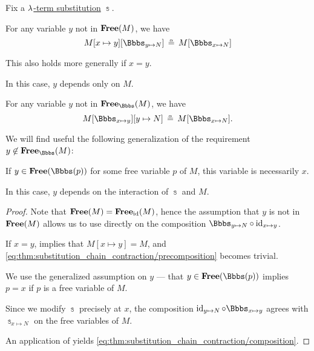 \begin{corollary}\label{thm:substitution_chain_contraction}
  Fix a \hyperref[def:lambda_term_substitution]{\( {\mathrm \lambda} \)-term substitution} \( \Bbbs \).

  \begin{thmenum}
     For any variable \( y \) not in \( \op*{Free}(M) \), we have
    \begin{equation}\label{eq:thm:substitution_chain_contraction/precomposition}
      M[x \mapsto y][\Bbbs_{y \mapsto N}]
      \aequiv
      M[\Bbbs_{x \mapsto N}]
    \end{equation}

    This also holds more generally if \( x = y \).

    In this case, \( y \) depends only on \( M \).

     For any variable \( y \) not in \( \op*{Free}_\Bbbs(M) \), we have
    \begin{equation}\label{eq:thm:substitution_chain_contraction/composition}
      M[\Bbbs_{x \mapsto y}][y \mapsto N]
      \aequiv
      M[\Bbbs_{x \mapsto N}].
    \end{equation}

    We will find useful the following generalization of the requirement \( y \not\in \op*{Free}_\Bbbs(M) \):
    \begin{displayquote}
      If \( y \in \op*{Free}(\Bbbs(p)) \) for some free variable \( p \) of \( M \), this variable is necessarily \( x \).
    \end{displayquote}

    In this case, \( y \) depends on the interaction of \( \Bbbs \) and \( M \).
  \end{thmenum}
\end{corollary}
\begin{proof}
   Note that \( \op*{Free}(M) = \op*{Free}_{\id}(M) \), hence the assumption that \( y \) is not in \( \op*{Free}(M) \) allows us to use  directly on the composition \( \Bbbs_{y \mapsto N} \bincirc \id_{x \mapsto y} \).

  If \( x = y \),  implies that \( M[x \mapsto y] = M \), and \eqref{eq:thm:substitution_chain_contraction/precomposition} becomes trivial.

   We use the generalized assumption on \( y \) --- that \( y \in \op*{Free}(\Bbbs(p)) \) implies \( p = x \) if \( p \) is a free variable of \( M \).

  Since we modify \( \Bbbs \) precisely at \( x \), the composition \( \id_{y \mapsto N} \bincirc \Bbbs_{x \mapsto y} \) agrees with \( \Bbbs_{x \mapsto N} \) on the free variables of \( M \).

  An application of  yields \eqref{eq:thm:substitution_chain_contraction/composition}.
\end{proof}

